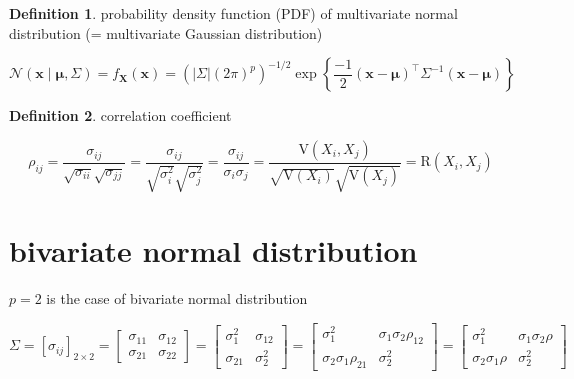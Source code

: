 \documentclass[
]{book}
\theoremstyle{definition}
\newtheorem{definition}{Definition}[chapter]
\theoremstyle{definition}
\theoremstyle{definition}
\theoremstyle{definition}
\theoremstyle{remark}
\begin{document}
\begin{definition}
\protect\hypertarget{def:unnamed-chunk-3}{}\label{def:unnamed-chunk-3}probability density function (PDF) of multivariate normal distribution (= multivariate Gaussian distribution)
\end{definition}

\[ 
\mathcal{N}\left(\boldsymbol{x}\mid\boldsymbol{\mu},\mathit{\Sigma}\right)=f_{\boldsymbol{X}}\left(\boldsymbol{x}\right)=\left(\left|\mathit{\Sigma}\right|\left(2\pi\right)^{p}\right)^{-1/2}\exp\left\{ \frac{-1}{2}\left(\boldsymbol{x}-\boldsymbol{\mu}\right)^{\intercal}\mathit{\Sigma}^{-1}\left(\boldsymbol{x}-\boldsymbol{\mu}\right)\right\} 
\]

\begin{definition}
\protect\hypertarget{def:unnamed-chunk-4}{}\label{def:unnamed-chunk-4}correlation coefficient
\end{definition}

\[
\rho_{ij}=\dfrac{\sigma_{ij}}{\sqrt{\sigma_{ii}}\sqrt{\sigma_{jj}}}=\dfrac{\sigma_{ij}}{\sqrt{\sigma_{i}^{2}}\sqrt{\sigma_{j}^{2}}}=\dfrac{\sigma_{ij}}{\sigma_{i}\sigma_{j}}=\dfrac{\mathrm{V}\left(X_{i},X_{j}\right)}{\sqrt{\mathrm{V}\left(X_{i}\right)}\sqrt{\mathrm{V}\left(X_{j}\right)}}=\mathrm{R}\left(X_{i},X_{j}\right)
\]

\section{bivariate normal distribution}\label{bivariate-normal-distribution}

\(p=2\) is the case of bivariate normal distribution

\[
\mathit{\Sigma}=\left[\sigma_{ij}\right]_{2\times2}=\begin{bmatrix}\sigma_{11} & \sigma_{12}\\
\sigma_{21} & \sigma_{22}
\end{bmatrix}=\begin{bmatrix}\sigma_{1}^{2} & \sigma_{12}\\
\sigma_{21} & \sigma_{2}^{2}
\end{bmatrix}=\begin{bmatrix}\sigma_{1}^{2} & \sigma_{1}\sigma_{2}\rho_{12}\\
\sigma_{2}\sigma_{1}\rho_{21} & \sigma_{2}^{2}
\end{bmatrix}=\begin{bmatrix}\sigma_{1}^{2} & \sigma_{1}\sigma_{2}\rho\\
\sigma_{2}\sigma_{1}\rho & \sigma_{2}^{2}
\end{bmatrix}
\]
\end{document}
